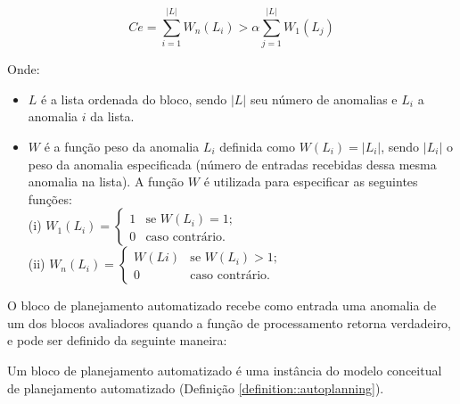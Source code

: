 \begin{definition}
\begin{itemize}
            \[ Ce = \sum_{i=1}^{|L|} W_{n}(L_{i}) > \alpha \sum_{j=1}^{|L|} W_{1}(L_{j}) \]
            
            Onde:
            
            \begin{itemize}
                \item $L$ é a lista ordenada do bloco, sendo $|L|$ seu número de anomalias e $L_{i}$ a anomalia $i$ da lista.
                \item $W$ é a função peso da anomalia $L_{i}$ definida como $W(L_{i}) = |L_{i}|$, sendo $|L_{i}|$ o peso da anomalia especificada (número de entradas recebidas dessa mesma anomalia na lista). A função $W$ é utilizada para especificar as seguintes funções:
                \\
                
                    (i) $ W_{1}(L_{i}) = \left\{ \begin{array}{ll}
                        1 & \mbox{se $W(L_{i}) = 1$;}\\
                        0 & \mbox{caso contrário}.\end{array} \right. $
                \\
                
                    (ii) $ W_{n}(L_{i}) = \left\{ \begin{array}{ll}
                        W(L{i}) & \mbox{se $W(L_{i}) > 1$;}\\
                        0 & \mbox{caso contrário}.\end{array} \right. $
            \end{itemize}{}
    \end{itemize}
\end{definition}{}

\vspace{0.2cm}

O bloco de planejamento automatizado recebe como entrada uma anomalia de um dos blocos avaliadores quando a função de processamento retorna verdadeiro, e pode ser definido da seguinte maneira:

\vspace{0.2cm}

\begin{definition}
    Um bloco de planejamento automatizado é uma instância do modelo conceitual de planejamento automatizado (Definição \ref{definition::autoplanning}).
\end{definition}

